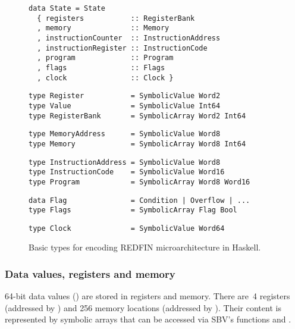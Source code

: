 \begin{figure}[t]

\begin{verbatim}
data State = State
  { registers           :: RegisterBank
  , memory              :: Memory
  , instructionCounter  :: InstructionAddress
  , instructionRegister :: InstructionCode
  , program             :: Program
  , flags               :: Flags
  , clock               :: Clock }
\end{verbatim}

\begin{verbatim}
type Register           = SymbolicValue Word2
type Value              = SymbolicValue Int64
type RegisterBank       = SymbolicArray Word2 Int64
\end{verbatim}

\begin{verbatim}
type MemoryAddress      = SymbolicValue Word8
type Memory             = SymbolicArray Word8 Int64
\end{verbatim}

\begin{verbatim}
type InstructionAddress = SymbolicValue Word8
type InstructionCode    = SymbolicValue Word16
type Program            = SymbolicArray Word8 Word16
\end{verbatim}

\begin{verbatim}
data Flag               = Condition | Overflow | ...
type Flags              = SymbolicArray Flag Bool
\end{verbatim}

\begin{verbatim}
type Clock              = SymbolicValue Word64
\end{verbatim}

\caption{Basic types for encoding REDFIN microarchitecture in Haskell.\label{fig-types}}

\end{figure}


\subsubsection{Data values, registers and memory}
64-bit data values () are stored in registers and memory. There are~4
registers (addressed by ) and 256 memory locations (addressed by
). Their content is represented by symbolic arrays that can be
accessed via SBV's functions  and .


